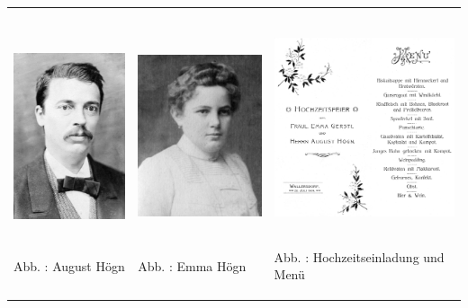\begin{flushleft}
\tablefirsthead{}
\tablehead{}
\tabletail{}
\tablelasttail{}
\begin{supertabular}{m{4.3650002cm}m{4.894cm}m{6.556cm}}

\includegraphics[width=4.182cm,height=6.186cm]{pictures/zulassungsarbeit-img012.jpg}

Abb. : August Högn &

\includegraphics[width=4.711cm,height=6.189cm]{pictures/zulassungsarbeit-img013.jpg}

Abb. : Emma Högn &

\includegraphics[width=6.218cm,height=6.179cm]{pictures/zulassungsarbeit-img014.png}

\label{bkm:Ref100297575}Abb. :
Hochzeitseinladung und Menü\\
\end{supertabular}
\end{flushleft}

